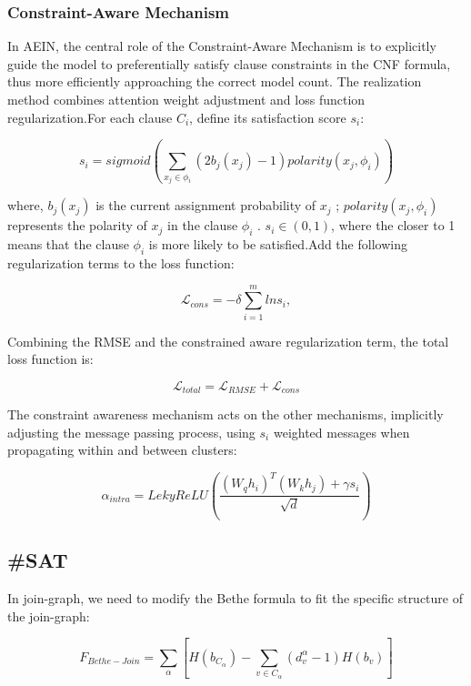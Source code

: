 \subsubsection{Constraint-Aware Mechanism}
In AEIN, the central role of the Constraint-Aware Mechanism is to explicitly guide the model to 
preferentially satisfy clause constraints in the CNF formula, thus more efficiently approaching the 
correct model count. The realization method combines attention weight adjustment and loss function 
regularization.For each clause \(C_i\), define its satisfaction score \(s_i\):

\begin{equation}
s_i=sigmoid(\sum_{x_j\in \phi_i}(2b_j(x_j)-1)polarity(x_j,\phi_i))
\end{equation}

where, \(b_j(x_j)\) is  the current assignment probability of \(x_j\) ;  \(polarity(x_j,\phi_i)\) 
represents the polarity of \(x_j\) in the clause \(\phi_i\) .
\(s_i\in (0,1)\), where the closer to 1 means that the clause \(\phi_i\) is more likely to be 
satisfied.Add the following regularization terms to the loss function:

\begin{equation}
\mathcal L_{cons}=-\delta  \sum_{i=1}^mlns_i,
\end{equation}

Combining the RMSE and the constrained aware regularization term, the total loss function is:

\begin{equation}
\mathcal L_{total}=\mathcal L_{RMSE}+\mathcal L_{cons}
\end{equation}

The constraint awareness mechanism acts on the other mechanisms, implicitly adjusting the message 
passing process, using \(s_i\) weighted messages when propagating within and between clusters:

\begin{equation}
\alpha_{intra}=LekyReLU(\frac{(W_qh_i)^T(W_kh_j)+\gamma s_i}{\sqrt{d}})
\end{equation}

\subsection{\#SAT}
In join-graph, we need to modify the Bethe formula to fit the specific structure of the join-graph:

\begin{equation}
   F_{Bethe-Join}=\sum_\alpha [H(b_{C_\alpha})-\sum_{v\in C_\alpha}(d_v^\alpha-1)H(b_v)]
\end{equation}

